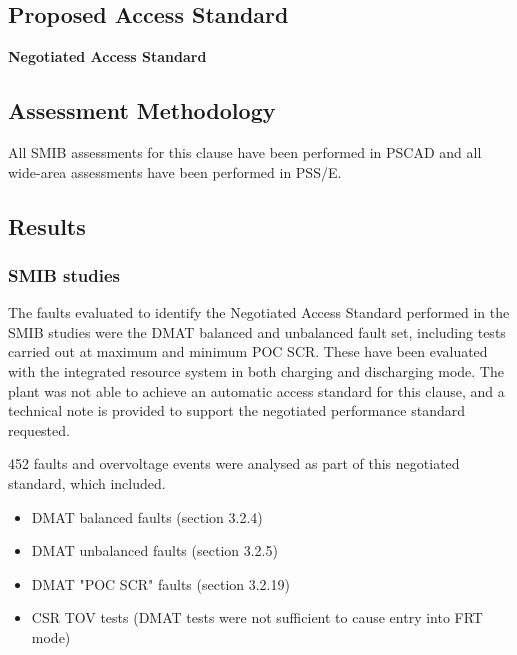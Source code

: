 \documentclass{../grid-link-report}
\newcommand{\projectassetsdir}{../project-assets}
\begin{document}
		\subsection{Proposed Access Standard}
		\textbf{Negotiated Access Standard}
			\begin{tcolorbox}[lightgreenbox]
				
			\end{tcolorbox}
		\subsection{Assessment Methodology}
		\label{subsec:assessment-method-s5255}
			
			
			All SMIB assessments for this clause have been performed in PSCAD and all wide-area assessments have been performed in PSS/E.
			
		\subsection{Results}
		
			\subsubsection{SMIB studies}
			The faults evaluated to identify the Negotiated Access Standard performed in the SMIB studies were the \ac{DMAT} \cite{pscad-dmat-report} balanced and unbalanced fault set, including tests carried out at maximum and minimum POC SCR. These have been evaluated with the integrated resource system in both charging and discharging mode. The plant was not able to achieve an automatic access standard for this clause, and a technical note is provided to support the negotiated performance standard requested. \cite{fault-performance-memo}
			
			452 faults and overvoltage events were analysed as part of this negotiated standard, which included.
			\begin{itemize}
				\item DMAT balanced faults (section 3.2.4)
				\item DMAT unbalanced faults (section 3.2.5)
				\item DMAT "POC SCR" faults (section 3.2.19)
				\item CSR TOV tests (DMAT tests were not sufficient to cause entry into FRT mode)
			\end{itemize}
			
\end{document}
